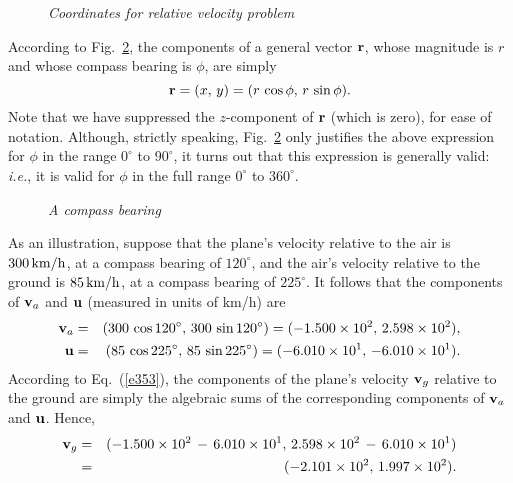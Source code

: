 \begin{figure}
\epsfysize=2in
\centerline{}
\caption{\em Coordinates for relative velocity problem}\label{f19}   
\end{figure}

According to Fig.~\ref{f20}, the components of
a general vector ${\bf r}$, whose magnitude is $r$ and whose compass bearing is $\phi$, are simply
\begin{equation}\label{e354}
{\bf r} = (x,\,y) = (r\,\cos\phi, \,r\,\sin\phi).
\end{equation}
Note that we have suppressed the $z$-component of ${\bf r}$ (which is zero), for ease of
notation. Although, strictly speaking,  Fig.~\ref{f20} only justifies the above expression for
$\phi$ in the range $0^\circ$ to $90^\circ$, it turns out that this expression
is generally valid: {\em i.e.}, it is valid for $\phi$ in the full range $0^\circ$ to
$360^\circ$. 

\begin{figure}
\epsfysize=2.5in
\centerline{}
\caption{\em A compass bearing}\label{f20}   
\end{figure}

As an illustration, suppose that the plane's velocity relative to the air
is $300\,{\rm km/h}$, at a compass bearing of $120^\circ$, and
 the air's velocity relative to the ground is $85\,{\rm km/h}$, at a compass
bearing of $225^\circ$. It follows that the components of ${\bf v}_a$ and
${\bf u}$ (measured in units of km/h) are 
\begin{eqnarray}
{\bf v}_a& =& (300\,\cos 120^\circ,\,300\,\sin 120^\circ) = (-1.500\times 10^2,\, 2.598\times 10^2),\\
{\bf u} &=& (85\,\cos 225^\circ,\,85\,\sin 225^\circ) =(-6.010\times 10^1,\,-6.010\times 10^1).
\end{eqnarray}
According to Eq.~(\ref{e353}), the components of the plane's velocity ${\bf v}_g$ relative to
the ground are simply the algebraic sums of the corresponding components
of ${\bf v}_a$ and ${\bf u}$. Hence,
\begin{eqnarray}
{\bf v}_g& =& (-1.500\times 10^2\,-\,6.010\times 10^1,\,2.598\times 10^2\,-\,6.010\times 10^1)\nonumber\\
&=& (-2.101\times 10^2, \, 1.997\times 10^2).
\end{eqnarray}

